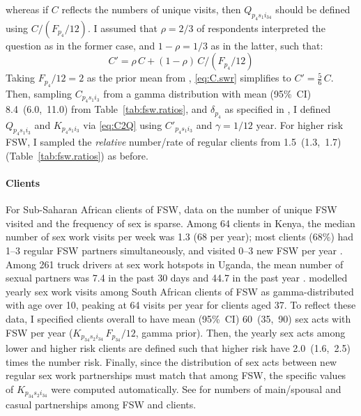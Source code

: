 whereas if $C$ reflects the numbers of unique visits, then
$Q_{p_{4}s_{1}i_{34}}$ should be defined using $C/(F_{p_{4}}/12)$.
I assumed that $\rho = 2/3$ of respondents interpreted the question as in the former case,
and $1-\rho = 1/3$ as in the latter, such that:
\begin{equation}\label{eq:C.swr}
  C' = \rho\,C + (1-\rho)\,C/(F_{p_{4}}/12)
\end{equation}
Taking $F_{p_{4}}/12 = 2$ as the prior mean from ,
\eqref{eq:C.swr} simplifies to $C' = \frac{5}{6}\,C$.
Then, sampling $C_{p_{4}s_{1}i_{3}}$
from a gamma distribution with mean (95\%~CI) 8.4~(6.0,~11.0) from Table~\ref{tab:fsw.ratios},
and $\delta_{p_{4}}$ as specified in ,
I defined $Q_{p_{4}s_{1}i_{3}}$ and $K_{p_{4}s_{1}i_{3}}$
via \eqref{eq:C2Q} using $C'_{p_{4}s_{1}i_{3}}$ and $\gamma = 1/12$ year.
For higher risk FSW, I sampled the \emph{relative} number/rate of regular clients from
1.5~(1.3,~1.7) (Table~\ref{tab:fsw.ratios}) as before.
\paragraph{Clients}
For Sub-Saharan African clients of FSW, data on
the number of unique FSW visited and the frequency of sex is sparse.
Among 64 clients in Kenya,
the median number of sex work visits per week was 1.3 (68 per year);
most clients (68\%) had 1--3 regular FSW partners simultaneously, and
visited 0--3 new FSW per year \cite{Voeten2002}.
Among 261 truck drivers at sex work hotspots in Uganda,
the mean number of sexual partners was
7.4 in the past 30 days and 44.7 in the past year \cite{Matovu2012}.
\citet{Johnson2017} modelled yearly sex work visits among South African clients of FSW as
gamma-distributed with age over 10, peaking at 64 visits per year for clients aged 37.
To reflect these data, I specified clients overall to have
mean (95\%~CI) 60~(35,~90) sex acts with FSW per year
($K_{p_{34}s_{2}i_{34}}\,F_{p_{34}}/12$, gamma prior).
Then, the yearly sex acts among lower and higher risk clients are defined such that
higher risk have 2.0~(1.6,~2.5) times the number risk.
Finally, since the distribution of sex acts between new \vs regular sex work partnerships
must match that among FSW, the specific values of $K_{p_{34}s_{2}i_{34}}$
were computed automatically.
See  for numbers of main/spousal and casual partnerships
among FSW and clients.
